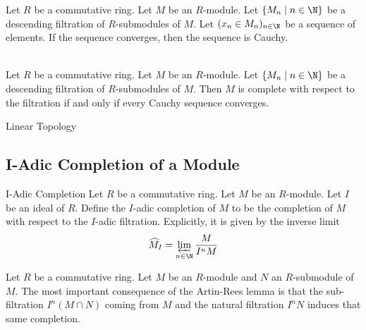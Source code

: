 \documentclass[a4paper]{article}
\begin{document}
\begin{lmm}{}{} Let $R$ be a commutative ring. Let $M$ be an $R$-module. Let $\{M_n\;|\;n\in\N\}$ be a descending filtration of $R$-submodules of $M$. Let $(x_n\in M_n)_{n\in\N}$ be a sequence of elements. If the sequence converges, then the sequence is Cauchy. 
\end{lmm}

\begin{prp}{}{}\\
Let $R$ be a commutative ring. Let $M$ be an $R$-module. Let $\{M_n\;|\;n\in\N\}$ be a descending filtration of $R$-submodules of $M$. Then $M$ is complete with respect to the filtration if and only if every Cauchy sequence converges. 
\end{prp}

\begin{defn}{Linear Topology}{}
\end{defn}

\subsection{I-Adic Completion of a Module}
\begin{defn}{I-Adic Completion}{} Let $R$ be a commutative ring. Let $M$ be an $R$-module. Let $I$ be an ideal of $R$. Define the $I$-adic completion of $M$ to be the completion of $M$ with respect to the $I$-adic filtration. Explicitly, it is given by the inverse limit $$\widehat{M}_I=\varprojlim_{n\in\N}\frac{M}{I^nM}$$
\end{defn}

Let $R$ be a commutative ring. Let $M$ be an $R$-module and $N$ an $R$-submodule of $M$. The most important consequence of the Artin-Rees lemma is that the sub-filtration $I^n(M\cap N)$ coming from $M$ and the natural filtration $I^nN$ induces that same completion. 
\end{document}
